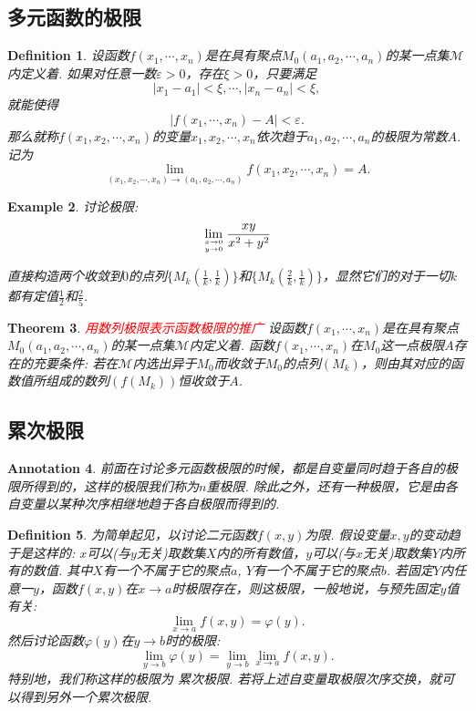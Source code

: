 \documentclass{article}
\newtheorem{theorem}{Theorem}[section]
\newtheorem{example}[theorem]{Example}
\newtheorem{definition}[theorem]{Definition}
\newtheorem{annotation}[theorem]{Annotation}
\newcommand{\redt}[1]{\textcolor{red}{#1}}
\begin{document}
\subsection{多元函数的极限}

\begin{definition}
\rm 设函数$f(x_1,\cdots,x_n)$是在具有聚点$M_0(a_1,a_2,\cdots,a_n)$的某一点集$\mathcal{M}$内定义着. 如果对任意一数$\varepsilon > 0$，存在$\xi > 0$，只要满足
$$
|x_1 - a_1| < \xi,\cdots,|x_n - a_n| < \xi,
$$
就能使得
$$
|f(x_1,\cdots,x_n) - A| < \varepsilon. 
$$
那么就称$f(x_1,x_2,\cdots,x_n)$的变量$x_1,x_2,\cdots,x_n$依次趋于$a_1,a_2,\cdots,a_n$的极限为常数$A$. 记为
$$
\lim\limits_{(x_1,x_2,\cdots,x_n) \to (a_1,a_2,\cdots,a_n)}f(x_1,x_2,\cdots,x_n) = A.
$$
\end{definition}

\begin{example}
\rm 讨论极限:
$$
\lim\limits_{x \rightarrow 0 \atop y \rightarrow 0 } \frac{xy}{x^2+y^2}
$$

直接构造两个收敛到$0$的点列$\{M_k(\frac{1}{k}, \frac{1}{k})\}$和$\{M_k(\frac{2}{k}, \frac{1}{k})\}$，显然它们的对于一切$k$都有定值$\frac{1}{2}$和$\frac{2}{5}$.
\end{example}

\begin{theorem}
\rm \redt{用数列极限表示函数极限的推广} 设函数$f(x_1,\cdots,x_n)$是在具有聚点$M_0(a_1,a_2,\cdots,a_n)$的某一点集$\mathcal{M}$内定义着. 函数$f(x_1,\cdots,x_n)$在$M_0$这一点极限$A$存在的充要条件: 若在$\mathcal{M}$内选出异于$M_0$而收敛于$M_0$的点列$(M_k)$，则由其对应的函数值所组成的数列$(f(M_k))$恒收敛于$A$. 
\end{theorem}

\subsection{累次极限}

\begin{annotation}
\rm 前面在讨论多元函数极限的时候，都是自变量同时趋于各自的极限所得到的，这样的极限我们称为{\color{red}$n$重极限}. 除此之外，还有一种极限，它是由各自变量以某种次序相继地趋于各自极限而得到的.
\end{annotation}

\begin{definition}
\rm 为简单起见，以讨论二元函数$f(x,y)$为限. 假设变量$x,y$的变动趋于是这样的: $x$可以(与$y$无关)取数集$X$内的所有数值，$y$可以(与$x$无关)取数集$Y$内所有的数值. 其中$X$有一个不属于它的聚点$a$, $Y$有一个不属于它的聚点$b$. 若固定$Y$内任意一$y$，函数$f(x,y)$在$x \rightarrow a$时极限存在，则这极限，一般地说，与预先固定$y$值有关:
$$
\lim\limits_{x \rightarrow a} f(x,y) = \varphi(y).
$$
然后讨论函数$\varphi(y)$在$y \rightarrow b$时的极限:
$$
\lim\limits_{y \rightarrow b} \varphi(y) = \lim\limits_{y \rightarrow b}\lim\limits_{x \rightarrow a} f(x,y).
$$
特别地，我们称这样的极限为{\color{red} 累次极限}. 若将上述自变量取极限次序交换，就可以得到另外一个累次极限.
\end{definition}
\end{document}
